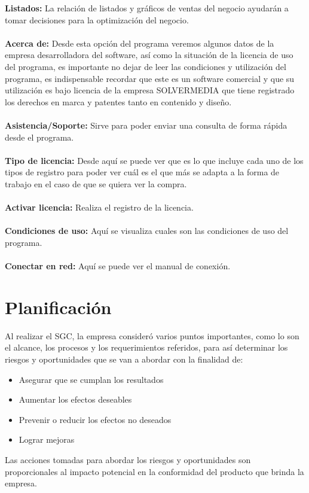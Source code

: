 \documentclass[12pt,a4paper]{article}
\begin{document}
\textbf {Listados:} La relación de listados y gráficos de ventas del negocio ayudarán a tomar decisiones para la optimización del negocio.\\\\
\textbf {Acerca de:} Desde esta opción del programa veremos algunos datos de la empresa desarrolladora del software, así como la situación de la licencia de uso del programa, es importante no dejar de leer las condiciones y utilización del programa, es indispensable recordar que este es un software comercial y que su utilización es bajo licencia de la empresa SOLVERMEDIA que tiene registrado los derechos en marca y patentes tanto en contenido y diseño.\\\\
\textbf {Asistencia/Soporte:} Sirve para poder enviar una consulta de forma rápida desde el programa.\\\\
\textbf {Tipo de licencia:} Desde aquí se puede ver que es lo que incluye cada uno de los tipos de registro para poder ver cuál es el que más se adapta a la forma de trabajo en el caso de que se quiera ver la compra.\\\\
\textbf {Activar licencia:} Realiza el registro de la licencia.\\\\
\textbf {Condiciones de uso:} Aquí se visualiza cuales son las condiciones de uso del programa.\\\\
\textbf {Conectar en red:} Aquí se puede ver el manual de conexión.
\par\vspace{0.5cm}

\section{Planificación}\textbf{}
Al realizar el SGC, la empresa consideró varios puntos importantes, como lo son el alcance, los procesos y los requerimientos referidos, para así determinar los riesgos y oportunidades que se van a abordar con la finalidad de:
\begin{itemize}
\item Asegurar que se cumplan los resultados
\item Aumentar los efectos deseables
\item Prevenir o reducir los efectos no deseados
\item Lograr mejoras
\end{itemize}
Las acciones tomadas para abordar los riesgos y oportunidades son proporcionales al impacto potencial en la conformidad del producto que brinda la empresa.
\end{document}
